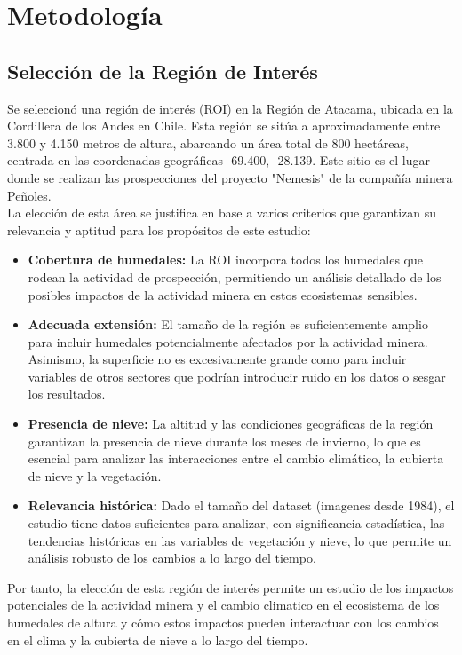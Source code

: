 \maketitle
\section{Metodología}

{\small
\subsection{\textbf{Selección de la Región de Interés}}

Se seleccionó una región de interés (ROI) en la Región de Atacama, ubicada en la Cordillera de los Andes en Chile. Esta región se sitúa a aproximadamente entre 3.800 y 4.150 metros de altura, abarcando un área total de 800 hectáreas, centrada en las coordenadas geográficas -69.400, -28.139. Este sitio es el lugar donde se realizan las prospecciones del proyecto "Nemesis" de la compañía minera Peñoles.\\

La elección de esta área se justifica en base a varios criterios que garantizan su relevancia y aptitud para los propósitos de este estudio:

\begin{itemize}

    \item \textbf{Cobertura de humedales:} La ROI incorpora todos los humedales que rodean la actividad de prospección, permitiendo un análisis detallado de los posibles impactos de la actividad minera en estos ecosistemas sensibles.
    
    \item \textbf{Adecuada extensión:} El tamaño de la región es suficientemente amplio para incluir humedales potencialmente afectados por la actividad minera. Asimismo, la superficie no es excesivamente grande como para incluir variables de otros sectores que podrían introducir ruido en los datos o sesgar los resultados.
    
    \item \textbf{Presencia de nieve:} La altitud y las condiciones geográficas de la región garantizan la presencia de nieve durante los meses de invierno, lo que es esencial para analizar las interacciones entre el cambio climático, la cubierta de nieve y la vegetación.
    
    \item \textbf{Relevancia histórica:} Dado el tamaño del dataset (imagenes desde 1984), el estudio tiene datos suficientes para analizar, con significancia estadística,  las tendencias históricas en las variables de vegetación y nieve, lo que permite un análisis robusto de los cambios a lo largo del tiempo.
    
\end{itemize}

Por tanto, la elección de esta región de interés permite un estudio  de los impactos potenciales de la actividad minera y el cambio climatico en el ecosistema de los humedales de altura y cómo estos impactos pueden interactuar con los cambios en el clima y la cubierta de nieve a lo largo del tiempo.
}

